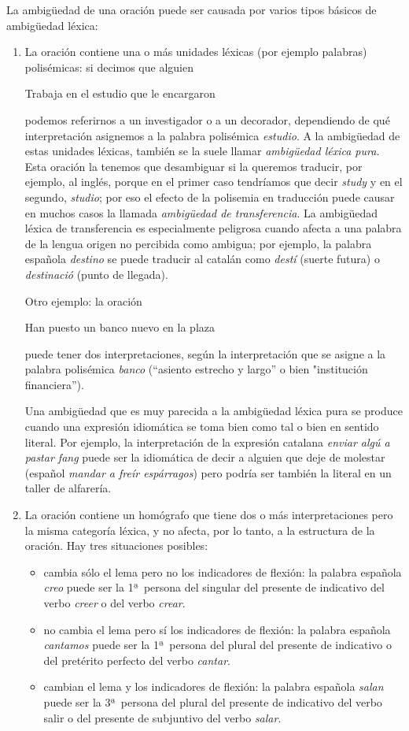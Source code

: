 La ambigüedad de una oración puede ser causada por varios tipos básicos de ambigüedad léxica: \begin{enumerate} \item La oración contiene una o más unidades léxicas (por ejemplo palabras) polisémicas: si decimos que alguien \begin{exemple} Trabaja en el estudio que le encargaron \end{exemple} podemos referirnos a un investigador o a un decorador, dependiendo de qué interpretación asignemos a la palabra polisémica \emph{estudio}. A la ambigüedad de estas unidades léxicas, también se la suele llamar {\em ambigüedad léxica pura}. Esta oración la tenemos que desambiguar si la queremos traducir, por ejemplo, al inglés, porque en el primer caso tendríamos que decir \emph{study} y en el segundo, \emph{studio}; por eso el efecto de la polisemia en traducción puede causar en muchos casos la llamada {\em ambigüedad de transferencia}. La ambigüedad léxica de transferencia es especialmente peligrosa cuando afecta a una palabra de la lengua origen no percibida como ambigua; por ejemplo, la palabra española \emph{destino} se puede traducir al catalán como {\em destí} (suerte futura) o \emph{destinació} (punto de llegada). 

Otro ejemplo: la oración \begin{exemple} Han puesto un banco nuevo en la plaza \end{exemple} puede tener dos interpretaciones, según la interpretación que se asigne a la palabra polisémica \emph{banco} (``asiento estrecho y largo'' o bien "institución financiera''). 

Una ambigüedad que es muy parecida a la ambigüedad léxica pura se produce cuando una expresión idiomática se toma bien como tal o bien en sentido literal. Por ejemplo, la interpretación de la expresión catalana \emph{enviar algú a pastar fang} puede ser la idiomática de decir a alguien que deje de molestar (español \emph{mandar a freír espárragos}) pero podría ser también la literal en un taller de alfarería. 

\item La oración contiene un homógrafo que tiene dos o más interpretaciones pero la misma categoría léxica, y no afecta, por lo tanto, a la estructura de la oración. Hay tres situaciones posibles: \begin{itemize} \item cambia sólo el lema pero no los indicadores de flexión: la palabra española \emph{creo} puede ser la 1ª\ persona del singular del presente de indicativo del verbo \emph{creer} o del verbo \emph{crear}. \item no cambia el lema pero sí los indicadores de flexión: la palabra española \emph{cantamos} puede ser la 1ª\ persona del plural del presente de indicativo o del pretérito perfecto del verbo \emph{cantar}. \item cambian el lema y los indicadores de flexión: la palabra española \emph{salan} puede ser la 3ª\ persona del plural del presente de indicativo del verbo salir o del presente de subjuntivo del verbo \emph{salar}. \end{itemize} 


\end{enumerate}
